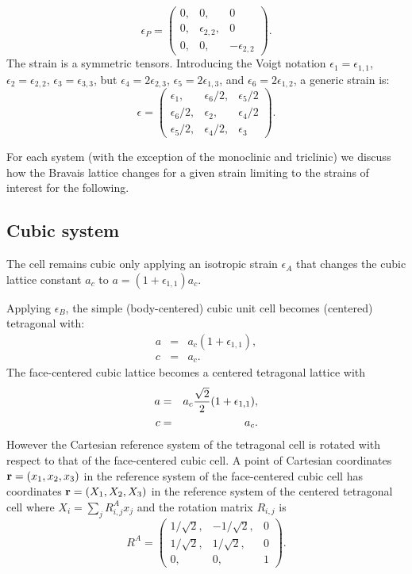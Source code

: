 \documentclass[12pt,a4paper]{article}
\begin{document}
\begin{equation}
\epsilon_P=\left( \begin{array}{ccc}
0, & 0, & 0 
\\
0, & \epsilon_{2,2}, & 0 
\\
0, & 0, & -\epsilon_{2,2}
\end{array}
\right).
\end{equation}
The strain is a symmetric tensors. Introducing the Voigt notation 
$\epsilon_1=\epsilon_{1,1}$,
$\epsilon_2=\epsilon_{2,2}$, $\epsilon_3=\epsilon_{3,3}$, but
$\epsilon_4=2 \epsilon_{2,3}$, $\epsilon_5=2 \epsilon_{1,3}$, and
$\epsilon_6=2 \epsilon_{1,2}$, a generic strain is:
\begin{equation}
\epsilon=\left( \begin{array}{ccc}
\epsilon_1, & \epsilon_6/2, & \epsilon_5/2 
\\
\epsilon_6/2, & \epsilon_2, & \epsilon_4/2  
\\
\epsilon_5/2, & \epsilon_4/2, & \epsilon_{3}
\end{array}
\right).
\end{equation}

For each system (with the exception of the monoclinic and triclinic) 
we discuss how the Bravais lattice changes for a given strain limiting
to the strains of interest for the following.

\subsection{\color{web-blue}Cubic system}
The cell remains cubic only applying an isotropic strain $\epsilon_A$ that 
changes the cubic lattice constant $a_c$ to $a=(1+\epsilon_{1,1})a_c$.

Applying $\epsilon_B$, the simple (body-centered) cubic
unit cell becomes (centered) tetragonal with:
\begin{eqnarray}
a&=&a_c (1+\epsilon_{1,1}), \\
c&=&a_c.
\end{eqnarray}
The face-centered cubic lattice becomes a centered tetragonal lattice with
\begin{eqnarray}
a&=&a_c {\sqrt{2} \over 2} (1+\epsilon_{1,1}), \\
c&=&a_c.
\end{eqnarray}
However the Cartesian reference system of the tetragonal cell
is rotated with respect to that of the face-centered cubic cell. 
A point of Cartesian coordinates ${\bf r}=(x_1,x_2,x_3)$ 
in the reference system of the face-centered cubic cell 
has coordinates 
${\bf r}=(X_1,X_2,X_3)$ in the reference system of the centered tetragonal cell
where $X_i=\sum_j R^A_{i,j} x_j$ and the rotation matrix $R_{i,j}$ is 
\begin{equation}
R^A=\left( \begin{array}{ccc}
1/\sqrt{2}, & -1/\sqrt{2}, & 0 
\\
1/\sqrt{2}, & 1/\sqrt{2}, & 0 
\\
0, & 0, & 1
\end{array}
\right).
\end{equation}
\end{document}
